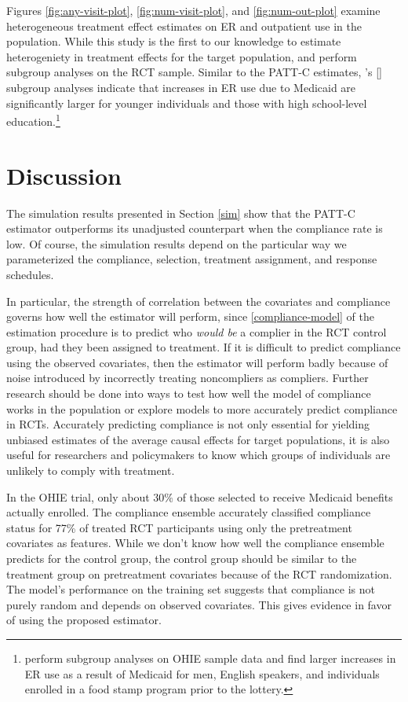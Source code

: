 \documentclass[hidelinks,12pt]{article}
\newcommand{\possessivecite}[1]{\citeauthor{#1}'s [\citeyear{#1}]}
\begin{document}
Figures \ref{fig:any-visit-plot}, \ref{fig:num-visit-plot}, and \ref{fig:num-out-plot} examine heterogeneous treatment effect estimates on ER and outpatient use in the population. While this study is the first to our knowledge to estimate heterogeniety in treatment effects for the target population, \citet{Taubman} and \citet{NBERw22363} perform subgroup analyses on the RCT sample. Similar to the PATT-C estimates, \possessivecite{Taubman} subgroup analyses indicate that increases in ER use due to Medicaid are significantly larger for younger individuals and those with high school-level education.\footnote{\citet{NBERw22363} perform subgroup analyses on OHIE sample data and find larger increases in ER use as a result of Medicaid for men, English speakers, and individuals enrolled in a food stamp program prior to the lottery.}

\section{Discussion} \label{discussion}

The simulation results presented in Section \ref{sim} show that the PATT-C estimator outperforms its unadjusted counterpart when the compliance rate is low. Of course, the simulation results depend on the particular way we parameterized the compliance, selection, treatment assignment, and response schedules. 

In particular, the strength of correlation between the covariates and compliance governs how well the estimator will perform, since \ref{compliance-model} of the estimation procedure is to predict who \textit{would be} a complier in the RCT control group, had they been assigned to treatment. If it is difficult to predict compliance using the observed covariates, then the estimator will perform badly because of noise introduced by incorrectly treating noncompliers as compliers. Further research should be done into ways to test how well the model of compliance works in the population or explore models to more accurately predict compliance in RCTs.  Accurately predicting compliance is not only essential for yielding unbiased estimates of the average causal effects for target populations, it is also useful for researchers and policymakers to know which groups of individuals are unlikely to comply with treatment. 

In the OHIE trial, only about $30\%$ of those selected to receive Medicaid benefits actually enrolled. The compliance ensemble accurately classified compliance status for 77\% of treated RCT participants using only the pretreatment covariates as features. While we don't know how well the compliance ensemble predicts for the control group, the control group should be similar to the treatment group on pretreatment covariates because of the RCT randomization. The model's performance on the training set suggests that compliance is not purely random and depends on observed covariates. This gives evidence in favor of using the proposed estimator. 
\end{document}
